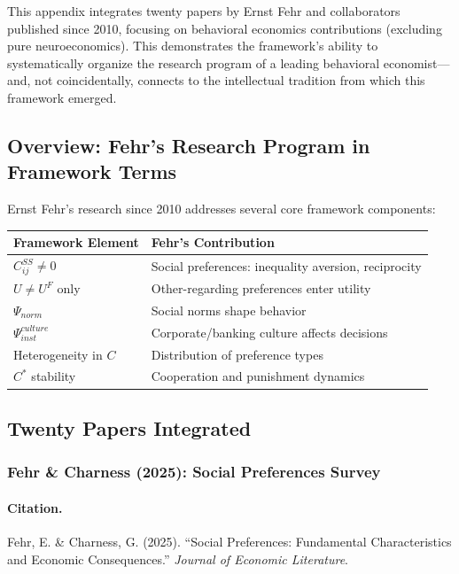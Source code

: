\documentclass[12pt,a4paper]{article}
\begin{document}
This appendix integrates twenty papers by Ernst Fehr and collaborators 
published since 2010, focusing on behavioral economics contributions
(excluding pure neuroeconomics). This demonstrates the framework's
ability to systematically organize the research program of a leading
behavioral economist---and, not coincidentally, connects to the
intellectual tradition from which this framework emerged.

\subsection{Overview: Fehr's Research Program in Framework Terms}

Ernst Fehr's research since 2010 addresses several core framework components:

\begin{center}
\renewcommand{\arraystretch}{1.2}
\small
\begin{tabular}{ll}
\hline
\textbf{Framework Element} & \textbf{Fehr's Contribution} \\
\hline
$C^{SS}_{ij} \neq 0$ & Social preferences: inequality aversion, reciprocity \\
$U \neq U^F$ only & Other-regarding preferences enter utility \\
$\Psi_{norm}$ & Social norms shape behavior \\
$\Psi_{inst}^{culture}$ & Corporate/banking culture affects decisions \\
Heterogeneity in $C$ & Distribution of preference types \\
$C^*$ stability & Cooperation and punishment dynamics \\
\hline
\end{tabular}
\end{center}

\subsection{Twenty Papers Integrated}

\subsubsection{Fehr \& Charness (2025): Social Preferences Survey}

\paragraph{Citation.}
Fehr, E. \& Charness, G. (2025). ``Social Preferences: Fundamental 
Characteristics and Economic Consequences.'' \emph{Journal of Economic Literature}.
\end{document}
